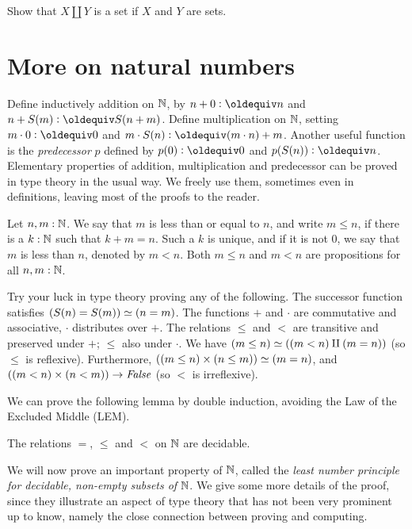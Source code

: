 \begin{xca}\label{xca:set-sum}
Show that $X\amalg Y$ is a set if $X$ and $Y$ are sets.
\end{xca}

\section{More on natural numbers}
\label{sec:more-on-N}

Define inductively addition on $\mathbb{N}$,
by $n+0\defeq n$ and $n+S(m)\defeq S(n+m)$. Define
multiplication on $\mathbb{N}$, setting $m\cdot 0\defeq 0$ and 
$m\cdot S(n)\defeq (m\cdot n) + m$. 
Another useful function is the \emph{predecessor} $p$ defined by
$p(0)\defeq 0$ and $p(S(n))\defeq n$.
Elementary properties of addition, multiplication and predecessor
can be proved in type theory in the usual way.
We freely use them, sometimes even in definitions, leaving most of the
proofs to the reader.

\begin{definition}
\label{def:orderonN}
Let $n,m:\mathbb{N}$. We say that $m$ is less than or equal to $n$, and write $m\leq n$,
if there is a $k:\mathbb{N}$ such that $k+m=n$. Such a $k$ is unique, and if it
is not $0$, we say that $m$ is less than $n$, denoted by $m<n$.
Both $m\leq n$ and $m<n$ are propositions for all $n,m:\mathbb{N}$.
\end{definition}

\begin{xca}\label{xca:try-your-luck-N}
Try your luck in type theory proving any of the following.
The successor function satisfies $(S(n)=S(m))\simeq(n=m)$.
The functions $+$ and $\cdot$ are commutative and associative,
$\cdot$ distributes over $+$.
The relations $\leq$ and $<$ are transitive and
preserved under $+$; $\leq$ also under $\cdot$. 
We have $(m\leq n) \simeq ((m<n)\amalg(m=n))$ (so $\leq$ is reflexive).
Furthermore, $((m\leq n)\times (n\leq m)) \simeq (m=n)$,
and $((m<n)\times(n<m))\to\mathop{\mathit{False}}$ (so $<$ is irreflexive).
\end{xca}

We can prove the following lemma by double induction, avoiding the 
Law of the Excluded Middle (LEM).

\begin{lemma}\label{lem:dec-eq+order-N}
The relations $=$, $\leq$ and $<$ on $\mathbb{N}$ are decidable.
\end{lemma}

We will now prove an important property of $\mathbb{N}$, called the
\emph{least number principle for decidable, non-empty subsets of} $\mathbb{N}$.
We give some more details of the proof, since they illustrate an aspect
of type theory that has not been very prominent up to know, namely
the close connection between proving and computing.

